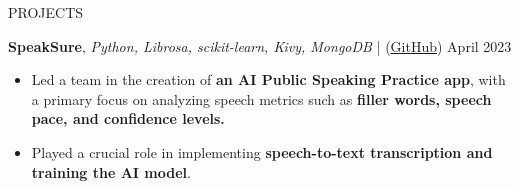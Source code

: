 \documentclass{resume} %
\begin{document}
\begin{rSection}{PROJECTS}
    \item \textbf{SpeakSure}, \textit{Python, Librosa, scikit-learn, Kivy, MongoDB} | (\href{https://github.com/ninadnaik10/SpeakSure} {GitHub}) \hfill {April 2023}
    \begin{itemize}
        \setlength\itemsep{-0.6em}
        \item  Led a team in the creation of \textbf{an AI Public Speaking Practice app}, with a primary focus on analyzing speech metrics such as \textbf{filler words, speech pace, and confidence levels.}
        \item Played a crucial role in implementing \textbf{speech-to-text transcription and training the AI model}.
    \end{itemize}

\end{rSection}
\end{document}
